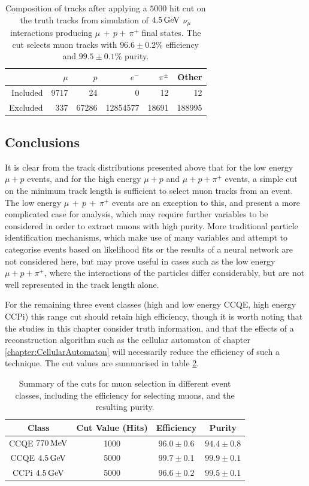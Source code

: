 \begin{table}
\centering
\begin{tabular}{*{6}{r}}
 & $\mu$ & $p$ & $e^-$ & $\pi^\pm$ & Other \\
\hline
\hline
Included & 9717 & 24 & 0 & 12 & 12 \\
Excluded & 337 & 67286 & 12854577 & 18691 & 188995 \\
\hline
\end{tabular}
\caption[Composition of tracks after $5000$ hit cut on $4.5\GeV$ CCPi events]{\label{table:cut-results-ccpi-4.5}Composition of tracks after applying a $5000$ hit cut on the truth tracks from simulation of $4.5\GeV$ $\nu_\mu$ interactions producing $\mu\, +\,p +\,\pi^{+}$ final states. The cut selects muon tracks with $96.6\pm0.2\%$ efficiency and $99.5\pm0.1\%$ purity.}
\end{table}

\subsection{Conclusions}
It is clear from the track distributions presented above that for the low energy $\mu + p$ events, and for the high energy $\mu + p$ and $\mu + p + \pi^+$ events, a simple cut on the minimum track length is sufficient to select muon tracks from an event. The low energy $\mu\, +\, p\, +\,\pi^+$ events are an exception to this, and present a more complicated case for analysis, which may require further variables to be considered in order to extract muons with high purity. More traditional particle identification mechanisms, which make use of many variables and attempt to categorise events based on likelihood fits or the results of a neural network are not considered here, but may prove useful in cases such as the low energy $\mu + p + \pi^+$, where the interactions of the particles differ considerably, but are not well represented in the track length alone.

For the remaining three event classes (high and low energy CCQE, high energy CCPi) this range cut should retain high efficiency, though it is worth noting that the studies in this chapter consider truth information, and that the effects of a reconstruction algorithm such as the cellular automaton of chapter \ref{chapter:CellularAutomaton} will necessarily reduce the efficiency of such a technique. The cut values are summarised in table \ref{table:summary_cuts}.

\begin{table}
\centering
\begin{tabular}{cccc}
Class & Cut Value (Hits) & Efficiency & Purity \\
\hline
\hline
CCQE $770\,\mathrm{MeV}$ & 1000 & $96.0\pm0.6$ & $94.4\pm0.8$ \\
CCQE $4.5\GeV$ & 5000 & $99.7\pm0.1$ & $99.9\pm0.1$ \\
CCPi $4.5\GeV$ & 5000 & $96.6\pm0.2$ & $99.5\pm0.1$ \\
\hline
\end{tabular}
\caption[Summary of cuts with efficiencies and purities]{\label{table:summary_cuts}Summary of the cuts for muon selection in different event classes, including the efficiency for selecting muons, and the resulting purity.}
\end{table}
